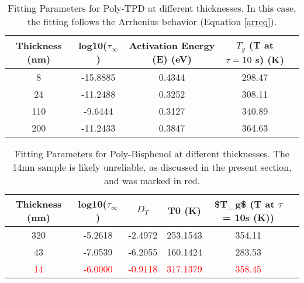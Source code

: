 \begin{table}[h]
	\caption{Fitting Parameters for Poly-TPD at different thicknesses. In this case, the fitting follows the Arrhenius behavior (Equation \ref{arreq}).}
    \label{tab:fitting-parameters-ptpd}
    \begin{center}
    \begin{tabular}{@{}ccccc@{}}
    \toprule
    Thickness (nm) & log10($\tau_\infty$) & Activation Energy (E) (eV) & $T_g$ (T at $\tau = 10$ s) (K) \\ \midrule
    8   & -15.8885 & 0.4344 & 298.47 \\
    24  & -11.2488 & 0.3252 & 308.11 \\
    110 & -9.6444  & 0.3127 & 340.89 \\
    200 & -11.2433 & 0.3847 & 364.63 \\
    \bottomrule
    \end{tabular}
    \end{center}
\end{table}


\begin{table}[h]
    \caption{Fitting Parameters for Poly-Bisphenol at different thicknesses. The 14nm sample is likely unreliable, as discussed in the present section, and was marked in red.}
    \label{tab:fitting-parameters-bisphenol}
    \begin{center}
    \begin{tabular}{@{}cccccc@{}}
    \toprule
    Thickness (nm) & log10($\tau_\infty$) & $D_T$ & T0 (K) & \ac{$T_g$} (T at $\tau$ = 10s (K)) \\ \midrule
    320 & -5.2618 & -2.4972 & 253.1543 & 354.11 \\
    43  & -7.0539 & -6.2055 & 160.1424 & 283.53 \\
    \textcolor{red}{14}  & \textcolor{red}{-6.0000} & \textcolor{red}{-0.9118} & \textcolor{red}{317.1379} & \textcolor{red}{358.45} \\ %
    \bottomrule
    \end{tabular}
    \end{center}
\end{table}




